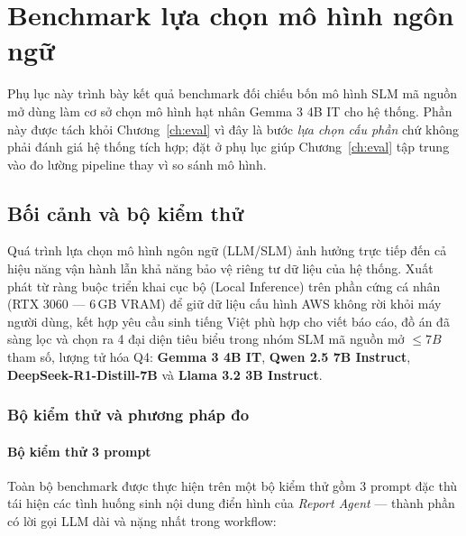 \chapter{Benchmark lựa chọn mô hình ngôn ngữ}
\label{app:model_benchmark}

Phụ lục này trình bày kết quả benchmark đối chiếu bốn mô hình SLM mã nguồn mở dùng làm cơ sở chọn mô hình hạt nhân Gemma 3 4B IT cho hệ thống. Phần này được tách khỏi Chương~\ref{ch:eval} vì đây là bước \emph{lựa chọn cấu phần} chứ không phải đánh giá hệ thống tích hợp; đặt ở phụ lục giúp Chương~\ref{ch:eval} tập trung vào đo lường pipeline thay vì so sánh mô hình.

\section{Bối cảnh và bộ kiểm thử}
\label{app:model_benchmark_context}

Quá trình lựa chọn mô hình ngôn ngữ (LLM/SLM) ảnh hưởng trực tiếp đến cả hiệu năng vận hành lẫn khả năng bảo vệ riêng tư dữ liệu của hệ thống. Xuất phát từ ràng buộc triển khai cục bộ (Local Inference) trên phần cứng cá nhân (RTX 3060 --- 6\,GB VRAM) để giữ dữ liệu cấu hình AWS không rời khỏi máy người dùng, kết hợp yêu cầu sinh tiếng Việt phù hợp cho viết báo cáo, đồ án đã sàng lọc và chọn ra 4 đại diện tiêu biểu trong nhóm SLM mã nguồn mở $\le 7B$ tham số, lượng tử hóa Q4: \textbf{Gemma 3 4B IT}, \textbf{Qwen 2.5 7B Instruct}, \textbf{DeepSeek-R1-Distill-7B} và \textbf{Llama 3.2 3B Instruct}.

\subsection{Bộ kiểm thử và phương pháp đo}
\label{app:model_benchmark_method}

\subsubsection*{Bộ kiểm thử 3 prompt}
Toàn bộ benchmark được thực hiện trên một bộ kiểm thử gồm 3 prompt đặc thù tái hiện các tình huống sinh nội dung điển hình của \textit{Report Agent} --- thành phần có lời gọi LLM dài và nặng nhất trong workflow:

